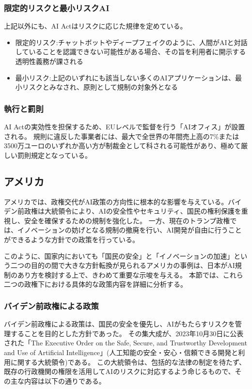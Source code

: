 \subsubsection{限定的リスクと最小リスクAI}

上記以外にも、AI Actはリスクに応じた規律を定めている。

\begin{itemize}
    \item 限定的リスク:チャットボットやディープフェイクのように、人間がAIと対話していることを認識できない可能性がある場合、その旨を利用者に開示する透明性義務が課される
    \item 最小リスク:上記のいずれにも該当しない多くのAIアプリケーションは、最小リスクとみなされ、原則として規制の対象外となる
\end{itemize}


\subsubsection{執行と罰則}

AI Actの実効性を担保するため、EUレベルで監督を行う「AIオフィス」が設置される。
規則に違反した事業者には、最大で全世界の年間売上高の7\%または3500万ユーロのいずれか高い方が制裁金として科される可能性があり、極めて厳しい罰則規定となっている。

\subsection{アメリカ}

アメリカでは、政権交代がAI政策の方向性に根本的な影響を与えている。バイデン前政権は大統領令により、AIの安全性やセキュリティ、国民の権利保護を重視し、安全を確保するための規制を強化した。
一方、現在のトランプ政権では、イノベーションの妨げとなる規制の撤廃を行い、AI開発が自由に行うことができるような方針での政策を行っている。

このように、国家内においても「国民の安全」と「イノベーションの加速」という二つの目的の間で大きな方針転換が見られるアメリカの事例は、日本がAI規制のあり方を検討する上で、きわめて重要な示唆を与える。
本節では、これら二つの政権下における具体的な政策内容を詳細に分析する。

\subsubsection{バイデン前政権による政策}

バイデン前政権による政策は、国民の安全を優先し、AIがもたらすリスクを管理することを目的とした方針であった。
その集大成が、2023年10月30日に公表された「The Executive Order on the Safe, Secure, and Trustworthy Development and Use of Artificial Intelligence」(人工知能の安全・安心・信頼できる開発と利用に関する大統領令)である。
この大統領令は、包括的な法律の制定を待たず、既存の行政機関の権限を活用してAIのリスクに対応するよう命じるもので、その主な内容は以下の通りである。

